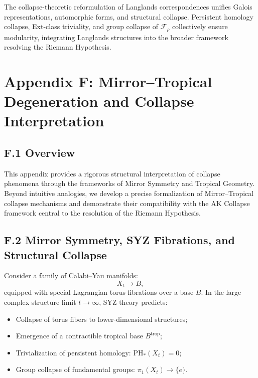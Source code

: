 \documentclass[11pt]{article}
\begin{document}
The collapse-theoretic reformulation of Langlands correspondences unifies Galois representations, automorphic forms, and structural collapse. Persistent homology collapse, Ext-class triviality, and group collapse of $\mathcal{F}_\rho$ collectively ensure modularity, integrating Langlands structures into the broader framework resolving the Riemann Hypothesis.



\section*{Appendix F: Mirror–Tropical Degeneration and Collapse Interpretation}

\subsection*{F.1 Overview}

This appendix provides a rigorous structural interpretation of collapse phenomena through the frameworks of Mirror Symmetry and Tropical Geometry. Beyond intuitive analogies, we develop a precise formalization of Mirror–Tropical collapse mechanisms and demonstrate their compatibility with the AK Collapse framework central to the resolution of the Riemann Hypothesis.

\subsection*{F.2 Mirror Symmetry, SYZ Fibrations, and Structural Collapse}

Consider a family of Calabi–Yau manifolds:
\[
X_t \longrightarrow B,
\]
equipped with special Lagrangian torus fibrations over a base $B$. In the large complex structure limit $t \to \infty$, SYZ theory predicts:

\begin{itemize}
    \item Collapse of torus fibers to lower-dimensional structures;
    \item Emergence of a contractible tropical base $B^{\mathrm{trop}}$;
    \item Trivialization of persistent homology: $\mathrm{PH}_*(X_t) = 0$;
    \item Group collapse of fundamental groups: $\pi_1(X_t) \longrightarrow \{ e \}$.
\end{itemize}
\end{document}
